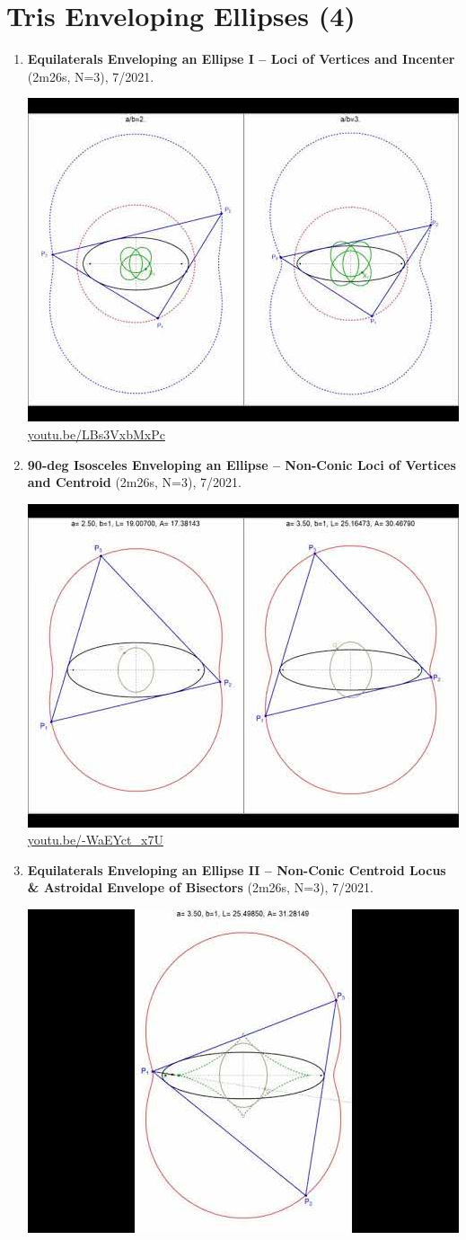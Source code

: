 \documentclass[12pt]{amsart}
\begin{document}
\section{Tris Enveloping Ellipses (4)}

\begin{enumerate}[resume]
\item \textbf{Equilaterals Enveloping an Ellipse I -- Loci of Vertices and Incenter} (2m26s, N=3), 7/2021. 
\begin{center}\includegraphics[width=.5\textwidth]{pics/LBs3VxbMxPc.jpg} \\ 
\href{https://youtu.be/LBs3VxbMxPc}{\url{youtu.be/LBs3VxbMxPc}}\end{center}
% 
\item \textbf{90-deg Isosceles Enveloping an Ellipse -- Non-Conic Loci of Vertices and Centroid} (2m26s, N=3), 7/2021. 
\begin{center}\includegraphics[width=.5\textwidth]{pics/-WaEYct_x7U.jpg} \\ 
\href{https://youtu.be/-WaEYct_x7U}{\url{youtu.be/-WaEYct\_x7U}}\end{center}
% 
\item \textbf{Equilaterals Enveloping an Ellipse II -- Non-Conic Centroid Locus \& Astroidal Envelope of Bisectors} (2m26s, N=3), 7/2021. 
\begin{center}\includegraphics[width=.5\textwidth]{pics/sZka-yj8IR4.jpg} \\ 

\end{center}
\end{enumerate}
\end{document}
